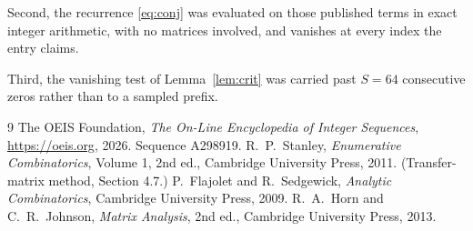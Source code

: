 \documentclass[11pt,a4paper]{article}
\theoremstyle{plain}
\theoremstyle{definition}
\begin{document}
Second, the recurrence \eqref{eq:conj} was evaluated on those published terms in exact
integer arithmetic, with no matrices involved, and vanishes at every index the entry claims.

Third, the vanishing test of Lemma~\ref{lem:crit} was carried past $S=64$ consecutive
zeros rather than to a sampled prefix.

\begin{thebibliography}{9}
 The OEIS Foundation, \emph{The On-Line Encyclopedia of Integer
Sequences}, \url{https://oeis.org}, 2026. Sequence A298919.
 R.~P.~Stanley, \emph{Enumerative Combinatorics}, Volume 1, 2nd ed.,
Cambridge University Press, 2011. (Transfer-matrix method, Section 4.7.)
 P.~Flajolet and R.~Sedgewick, \emph{Analytic Combinatorics}, Cambridge
University Press, 2009.
 R.~A.~Horn and C.~R.~Johnson, \emph{Matrix Analysis}, 2nd ed., Cambridge
University Press, 2013.
\end{thebibliography}
\end{document}
